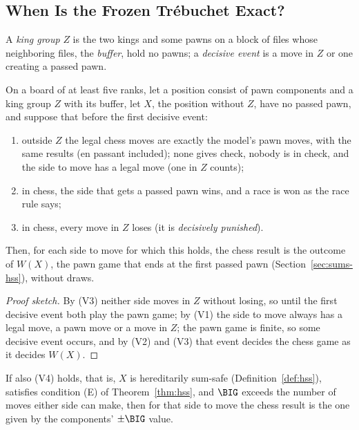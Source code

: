 \subsection{When Is the Frozen Tr\'ebuchet Exact?}\label{sec:kings-valid}

A \emph{king group} $Z$ is the two kings and some pawns on a block of files whose neighboring files, the
\emph{buffer}, hold no pawns; a \emph{decisive event} is a move in $Z$ or one creating a passed pawn.

\begin{theorem}\label{thm:validity}
On a board of at least five ranks, let a position consist of pawn components and a king group $Z$ with its buffer, let $X$, the position without $Z$, have no passed pawn, and suppose that before the
first decisive event:
\begin{enumerate}
\item[(V1)] outside $Z$ the legal chess moves are exactly the model's pawn moves, with the same results (en
  passant included); none gives check, nobody is in check, and the side to move has a legal move (one in $Z$
  counts);
\item[(V2)] in chess, the side that gets a passed pawn wins, and a race is won as the race rule says;
\item[(V3)] in chess, every move in $Z$ loses (it is \emph{decisively punished}).
\end{enumerate}
Then, for each side to move for which this holds, the chess result is the outcome of $W(X)$, the pawn game that ends at the first
passed pawn (Section~\ref{sec:sums-hss}), without draws.
\end{theorem}

\begin{proof}[Proof sketch]
By (V3) neither side moves in $Z$ without losing, so until the first decisive event both play the pawn game;
by (V1) the side to move always has a legal move, a pawn move or a move in $Z$; the pawn game is finite, so some
decisive event occurs, and by (V2) and (V3) that event
decides the chess game as it decides $W(X)$.
\end{proof}

\begin{corollary}[\lab{S}]\label{cor:v4}
If also (V4) holds, that is, $X$ is hereditarily sum-safe (Definition~\ref{def:hss}), satisfies condition (E) of
Theorem~\ref{thm:hss}, and $\BIG$ exceeds the number of moves either side can make, then for that side to move
the chess result is the one given by the components' $\pm\BIG$ value.
\end{corollary}

